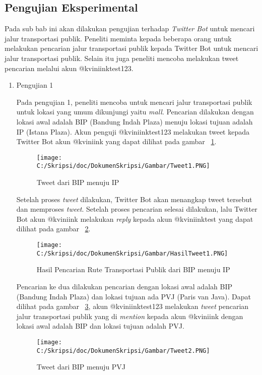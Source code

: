 \subsection{Pengujian Eksperimental}
Pada sub bab ini akan dilakukan pengujian terhadap \textit{Twitter Bot} untuk mencari jalur transportasi publik. Peneliti meminta kepada beberapa orang untuk melakukan pencarian jalur transportasi publik kepada Twitter Bot untuk mencari jalur transportasi publik. Selain itu juga peneliti mencoba melakukan tweet pencarian melalui akun @kviniinktest123.

\begin{enumerate}
	\item Pengujian 1
	
	Pada pengujian 1, peneliti mencoba untuk mencari jalur transportasi publik untuk lokasi yang umum dikunjungi yaitu \textit{mall}. Pencarian dilakukan dengan lokasi awal adalah BIP (Bandung Indah Plaza) menuju lokasi tujuan adalah IP (Istana Plaza). Akun penguji @kviniinktest123 melakukan tweet kepada Twitter Bot akun @kviniink yang dapat dilihat pada gambar ~\ref{fig:Tweet1}.
	
	\begin{figure}
		\centering
			\texttt{[image: C:/Skripsi/doc/DokumenSkripsi/Gambar/Tweet1.PNG]}
		\caption{Tweet dari BIP menuju IP}
		\label{fig:Tweet1}
	\end{figure}
	
	Setelah proses \textit{tweet} dilakukan, Twitter Bot akan menangkap tweet tersebut dan memproses \textit{tweet}. Setelah proses pencarian selesai dilakukan, lalu Twitter Bot akun @kviniink melakukan \textit{reply} kepada akun @kviniinktest yang dapat dilihat pada gambar ~\ref{fig:HasilTweet1}. 
	
		
	\begin{figure}
		\centering
			\texttt{[image: C:/Skripsi/doc/DokumenSkripsi/Gambar/HasilTweet1.PNG]}
		\caption{Hasil Pencarian Rute Transportasi Publik dari BIP menuju IP}
		\label{fig:HasilTweet1}
	\end{figure}
	
	Pencarian ke dua dilakukan pencarian dengan lokasi awal adalah BIP (Bandung Indah Plaza) dan lokasi tujuan ada PVJ (Paris van Java). Dapat dilihat pada gambar ~\ref{fig:Tweet2}, akun @kviniinktest123 melakukan \textit{tweet} pencarian jalur transportasi publik yang di \textit{mention} kepada akun @kviniink dengan lokasi awal adalah BIP dan lokasi tujuan adalah PVJ.
	
	\begin{figure}
		\centering
			\texttt{[image: C:/Skripsi/doc/DokumenSkripsi/Gambar/Tweet2.PNG]}
		\caption{Tweet dari BIP menuju PVJ}
		\label{fig:Tweet2}
	\end{figure}
	

\end{enumerate}
